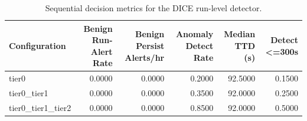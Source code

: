 \begin{table}[t]
\centering
\caption{Sequential decision metrics for the DICE run-level detector.}
\label{tab:dice_sequential_metrics}
\footnotesize
\begin{tabular}{lrrrrr}
\toprule
Configuration & Benign Run-Alert Rate & Benign Persist Alerts/hr & Anomaly Detect Rate & Median TTD (s) & Detect <=300s \\
\midrule
tier0 & 0.0000 & 0.0000 & 0.2000 & 92.5000 & 0.1500 \\
tier0_tier1 & 0.0000 & 0.0000 & 0.3500 & 92.0000 & 0.2500 \\
tier0_tier1_tier2 & 0.0000 & 0.0000 & 0.8500 & 92.0000 & 0.5000 \\
\bottomrule
\end{tabular}

\end{table}

